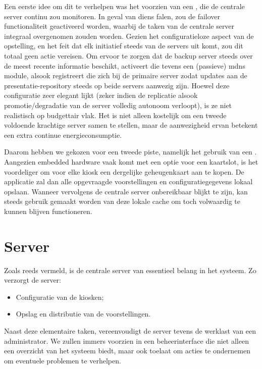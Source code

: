 Een eerste idee om dit te verhelpen was het voorzien van een , die de centrale server continu zou monitoren. In geval van diens falen, zou de failover functionaliteit geactiveerd worden, waarbij de taken van de centrale server integraal overgenomen zouden worden. Gezien het configuratieloze aspect van de opstelling, en het feit dat elk initiatief steeds van de servers uit komt, zou dit totaal geen actie vereisen. Om ervoor te zorgen dat de backup server steeds over de meest recente informatie beschikt, activeert die tevens een (passieve) \ac{mdns} module, alsook registreert die zich bij de primaire server zodat updates aan de presentatie-repository steeds op beide servers aanwezig zijn.
Hoewel deze configuratie zeer elegant lijkt (zeker indien de replicatie alsook promotie/degradatie van de server volledig autonoom verloopt), is ze niet realistisch op budgettair vlak. Het is niet alleen kostelijk om een tweede voldoende krachtige server samen te stellen, maar de aanwezigheid ervan betekent een extra continue energieconsumptie.

Daarom hebben we gekozen voor een tweede piste, namelijk het gebruik van een . Aangezien embedded hardware vaak komt met een optie voor een kaartslot, is het voordeliger om voor elke kiosk een dergelijke geheugenkaart aan te kopen. De applicatie zal dan alle opgevraagde voorstellingen en configuratiegegevens lokaal opslaan. Wanneer vervolgens de centrale server onbereikbaar blijkt te zijn, kan steeds gebruik gemaakt worden van deze lokale cache om toch volwaardig te kunnen blijven functioneren.

\section{Server}
\label{ontwerp:applicatie:server}

Zoals reeds vermeld, is de centrale server van essentieel belang in het systeem. Zo verzorgt de server:
\begin{itemize}
\item Configuratie van de kiosken;
\item Opslag en distributie van de voorstellingen.
\end{itemize}

Naast deze elementaire taken, vereenvoudigt de server tevens de werklast van een administrator. We zullen immers voorzien in een beheerinterface die niet alleen een overzicht van het systeem biedt, maar ook toelaat om acties te ondernemen om eventuele problemen te verhelpen.

